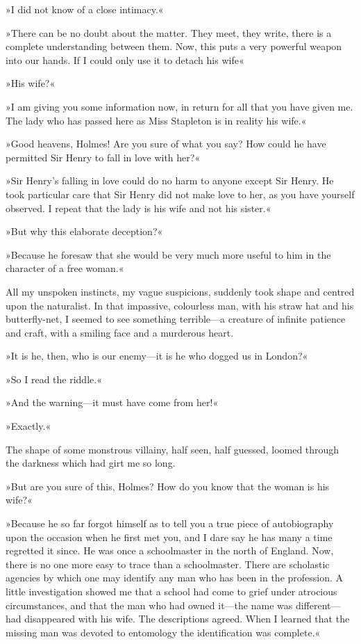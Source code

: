 »I did not know of a close intimacy.«

»There can be no doubt about the matter. They meet, they write, there is a complete understanding between them. Now, this puts a very powerful weapon into our hands. If I could only use it to detach his wife\longdash«

»His wife?«

»I am giving you some information now, in return for all that you have given me. The lady who has passed here as Miss Stapleton is in reality his wife.«

»Good heavens, Holmes! Are you sure of what you say? How could he have permitted Sir Henry to fall in love with her?«

»Sir Henry's falling in love could do no harm to anyone except Sir Henry. He took particular care that Sir Henry did not make love to her, as you have yourself observed. I repeat that the lady is his wife and not his sister.«

»But why this elaborate deception?«

»Because he foresaw that she would be very much more useful to him in the character of a free woman.«

All my unspoken instincts, my vague suspicions, suddenly took shape and centred upon the naturalist. In that impassive, colourless man, with his straw hat and his butterfly-net, I seemed to see something terrible—a creature of infinite patience and craft, with a smiling face and a murderous heart.

»It is he, then, who is our enemy—it is he who dogged us in London?«

»So I read the riddle.«

»And the warning—it must have come from her!«

»Exactly.«

The shape of some monstrous villainy, half seen, half guessed, loomed through the darkness which had girt me so long.

»But are you sure of this, Holmes? How do you know that the woman is his wife?«

»Because he so far forgot himself as to tell you a true piece of autobiography upon the occasion when he first met you, and I dare say he has many a time regretted it since. He was once a schoolmaster in the north of England. Now, there is no one more easy to trace than a schoolmaster. There are scholastic agencies by which one may identify any man who has been in the profession. A little investigation showed me that a school had come to grief under atrocious circumstances, and that the man who had owned it—the name was different—had disappeared with his wife. The descriptions agreed. When I learned that the missing man was devoted to entomology the identification was complete.«

